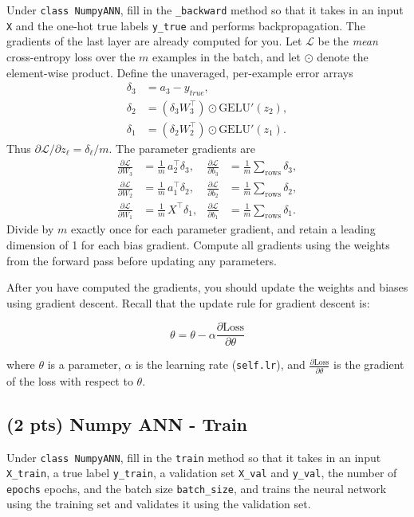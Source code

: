 \documentclass[11pt]{exam}
\begin{document}
Under \verb|class NumpyANN|, fill in the \verb|_backward| method so that it takes in an input \verb|X| and the one-hot true labels \verb|y_true| and performs backpropagation. The gradients of the last layer are already computed for you. Let $\mathcal{L}$ be the \emph{mean} cross-entropy loss over the $m$ examples in the batch, and let $\odot$ denote the element-wise product. Define the unaveraged, per-example error arrays
\begin{align*}
\delta_3 &= a_3 - y_{true},\\
\delta_2 &= (\delta_3 W_3^\top) \odot \text{GELU}'(z_2),\\
\delta_1 &= (\delta_2 W_2^\top) \odot \text{GELU}'(z_1).
\end{align*}
Thus $\partial \mathcal{L}/\partial z_\ell = \delta_\ell/m$. The parameter gradients are
\begin{align}
\frac{\partial \mathcal{L}}{\partial W_3} &= \frac{1}{m}\,a_2^\top\delta_3,
& \frac{\partial \mathcal{L}}{\partial b_3} &= \frac{1}{m}\sum_{\text{rows}}\delta_3,\\
\frac{\partial \mathcal{L}}{\partial W_2} &= \frac{1}{m}\,a_1^\top\delta_2,
& \frac{\partial \mathcal{L}}{\partial b_2} &= \frac{1}{m}\sum_{\text{rows}}\delta_2,\\
\frac{\partial \mathcal{L}}{\partial W_1} &= \frac{1}{m}\,X^\top\delta_1,
& \frac{\partial \mathcal{L}}{\partial b_1} &= \frac{1}{m}\sum_{\text{rows}}\delta_1.
\end{align}
Divide by $m$ exactly once for each parameter gradient, and retain a leading dimension of 1 for each bias gradient. Compute all gradients using the weights from the forward pass before updating any parameters.

After you have computed the gradients, you should update the weights and biases using gradient descent. Recall that the update rule for gradient descent is:

$$\theta = \theta - \alpha \frac{\partial \text{Loss}}{\partial\theta}$$


where $\theta$ is a parameter, $\alpha$ is the learning rate (\verb|self.lr|), and $\frac{\partial \text{Loss}}{\partial \theta}$ is the gradient of the loss with respect to $\theta$.

\subsection{(2 pts) Numpy ANN - Train}

Under \verb|class NumpyANN|, fill in the \verb|train| method so that it takes in an input \verb|X_train|, a true label \verb|y_train|, a validation set \verb|X_val| and \verb|y_val|, the number of \verb|epochs| epochs, and the batch size \verb|batch_size|, and trains the neural network using the training set and validates it using the validation set.
\end{document}
